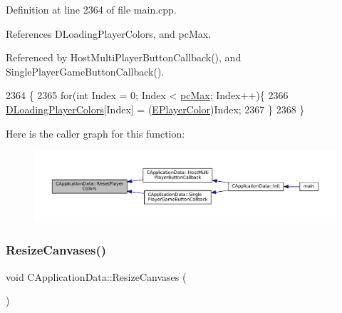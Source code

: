 Definition at line 2364 of file main.\+cpp.



References D\+Loading\+Player\+Colors, and pc\+Max.



Referenced by Host\+Multi\+Player\+Button\+Callback(), and Single\+Player\+Game\+Button\+Callback().


\begin{DoxyCode}
2364                                         \{
2365     \textcolor{keywordflow}{for}(\textcolor{keywordtype}{int} Index = 0; Index < \hyperlink{GameDataTypes_8h_aafb0ca75933357ff28a6d7efbdd7602fa594a5c8dd3987f24e8a0f23f1a72cd34}{pcMax}; Index++)\{
2366         \hyperlink{classCApplicationData_ab29b80d90f1201608dcb498cd627a6f9}{DLoadingPlayerColors}[Index] = (\hyperlink{GameDataTypes_8h_aafb0ca75933357ff28a6d7efbdd7602f}{EPlayerColor})Index;
2367     \}
2368 \}
\end{DoxyCode}
Here is the caller graph for this function\+:\nopagebreak
\begin{figure}[H]
\begin{center}
\leavevmode
\includegraphics[width=350pt]{classCApplicationData_a46653e8a3ed079f3921ec0257e49eb89_icgraph}
\end{center}
\end{figure}
\hypertarget{classCApplicationData_ad8b16ccb099b4996ce9fee34a407c091}{}\label{classCApplicationData_ad8b16ccb099b4996ce9fee34a407c091} 
\subsubsection{\texorpdfstring{Resize\+Canvases()}{ResizeCanvases()}}
{\footnotesize\ttfamily void C\+Application\+Data\+::\+Resize\+Canvases (\begin{DoxyParamCaption}{ }\end{DoxyParamCaption})\hspace{0.3cm}{\ttfamily [protected]}}



